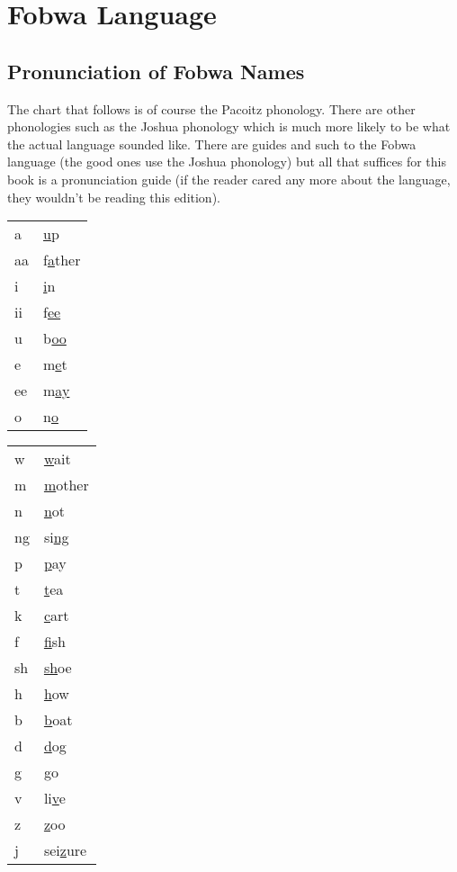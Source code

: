 \chapter{Fo\-bwa Language}
\section{Pronunciation of Fobwa Names}
The chart that follows is of course the Pacoitz phonology. There are other phonologies such as the Joshua phonology which is much more likely to be what the actual language sounded like. There are guides and such to the Fobwa language (the good ones use the Joshua phonology) but all that suffices for this book is a pronunciation guide (if the reader cared any more about the language, they wouldn't be reading this edition).\\
\begin{tabular}
{| l  l |}
\hline
a & \underline{u}p \\
aa & f\underline{a}ther \\
i & \underline{i}n \\
ii & f\underline{ee} \\
u & b\underline{oo} \\
e & m\underline{e}t \\
ee & m\underline{ay} \\
o & n\underline{o} \\
\hline
\end{tabular}
\begin{tabular}
{| l   l |}
\hline
w & \underline{w}ait \\
m & \underline{m}other \\
n & \underline{n}ot \\
ng & si\underline{ng} \\
p & \underline{p}ay \\
t & \underline{t}ea \\
k & \underline{c}art \\
f & \underline{f}ish \\
sh & \underline{sh}oe \\
h & \underline{h}ow \\
b & \underline{b}oat \\
d & \underline{d}og \\
g & \underline{g}o \\
v & li\underline{v}e \\
z & \underline{z}oo \\
j & sei\underline{z}ure \\
\hline
\end{tabular}
